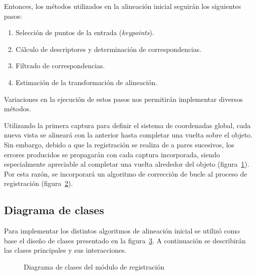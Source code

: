 	Entonces, los métodos utilizados en la alineación inicial seguirán los siguientes pasos:
	\begin{enumerate}
		\item Selección de puntos de la entrada (\emph{keypoints}).
		\item Cálculo de descriptores y determinación de correspondencias.
		\item Filtrado de correspondencias.
		\item Estimación de la transformación de alineación.
	\end{enumerate}
	Variaciones en la ejecución de estos pasos nos permitirán implementar diversos métodos.


	Utilizando la primera captura para definir el sistema de coordenadas
	global, cada nueva vista se alineará con la anterior hasta completar una
	vuelta sobre el objeto.  Sin embargo, debido a que la registración se
	realiza de a pares sucesivos, los errores producidos se propagarán con cada
	captura incorporada, siendo especialmente apreciable al completar una
	vuelta alrededor del objeto (figura~\ref{fig:error_bucle}).
	Por esta razón, se incorporará un algoritmo de corrección de bucle al proceso de registración
	(figura~\ref{fig:flow_registracion}).

	\begin{figure}
		\caption{\label{fig:error_bucle}}
	\end{figure}

	\begin{figure}
		\caption{\label{fig:flow_registracion}}
	\end{figure}

	\subsection{Diagrama de clases}
		Para implementar los distintos algoritmos de alineación inicial se utilizó como base
		el diseño de clases presentado en la figura~\ref{fig:align_class}.
		A continuación se describirán las clases principales y sus interacciones.
		\begin{figure}
			\caption{\label{fig:align_class}Diagrama de clases del módulo de registración}
		\end{figure}

